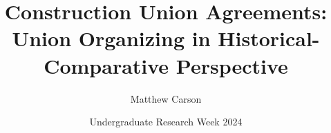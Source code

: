 \documentclass{beamer}
\title[Construction Union\ldots{Historical-Comparative}]{Construction Union Agreements: Union Organizing in Historical-Comparative Perspective}
\author{Matthew Carson}
\date[Undergrad. Research Week '24]{Undergraduate Research Week 2024}
\begin{document}
\begin{frame}
  \titlepage
\end{frame}




\end{document}
